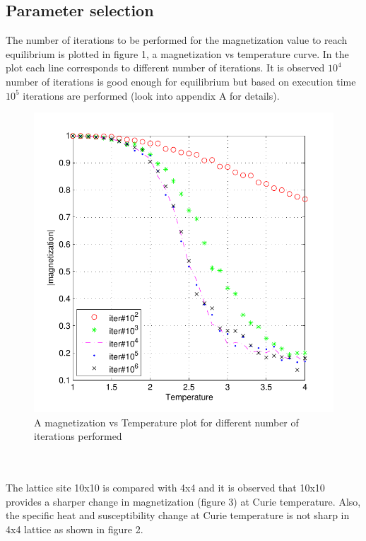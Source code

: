 \documentclass[]{article}
\begin{document}
\subsection{Parameter selection}
The number of iterations to be performed for the magnetization value to reach equilibrium is plotted in figure 1, a magnetization vs temperature curve. In the plot each line corresponds to different number of iterations. It is observed $10^4$ number of iterations is good enough for equilibrium but based on execution time $10^5$ iterations are performed (look into appendix A for details).
\begin{figure}[H]
  \centering
  \includegraphics[scale=0.9]{figures/fig_1}%
  \caption{\label{fig:epsart} A magnetization vs Temperature plot for different number of iterations performed}
\end{figure}
\\
\\
The lattice site 10x10 is compared with 4x4 and it is observed that 10x10 provides a sharper change in magnetization (figure 3) at Curie temperature. Also, the specific heat and susceptibility change at Curie temperature is not sharp in 4x4 lattice as shown in figure 2.
\end{document}
